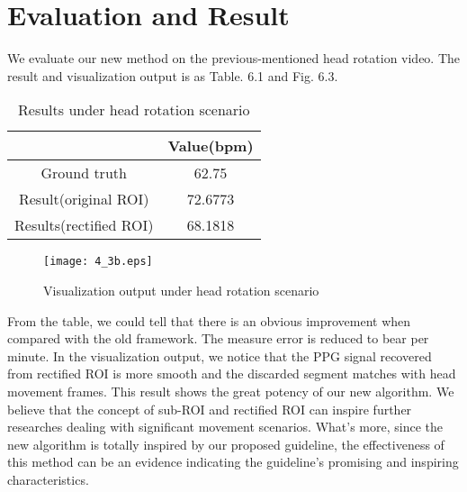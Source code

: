 \section{Evaluation and Result}
We evaluate our new method on the previous-mentioned head rotation video. The result and visualization output is as Table. 6.1 and Fig. 6.3.



\begin{table}[htbp]
\centering
\caption{Results under head rotation scenario} \label{tab:simpletable}
\begin{tabular}{|c|c|}
    \hline
     & Value(bpm) \\
    \hline
    Ground truth & 62.75 \\
    \hline
    Result(original ROI) & 72.6773 \\
    \hline
    Results(rectified ROI) & 68.1818\\
    \hline
\end{tabular}
\end{table}


\begin{figure}[ht]
\centering
\texttt{[image: 4\_3b.eps]}
\caption{Visualization output under head rotation scenario}\label{fig:noted-figure}
\end{figure}


From the table, we could tell that there is an obvious improvement when compared with the old framework. The measure error is reduced to  bear per minute. In the visualization output, we notice that the PPG signal recovered from rectified ROI is more smooth and the discarded segment matches with head movement frames. This result shows the great potency of our new algorithm. We believe that the concept of sub-ROI and rectified ROI can inspire further researches dealing with significant movement scenarios. What's more, since the new algorithm is totally inspired by our proposed guideline, the effectiveness of this method can be an evidence indicating the guideline's promising and inspiring characteristics.










